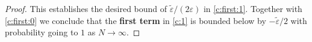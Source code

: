\begin{proof}
This establishes the desired bound of 
$
\tilde{\varepsilon}/(2\varepsilon)
$
in \eqref{c:first:1}.
Together with \eqref{c:first:0}
we conclude that the \textbf{first term} 
in
\eqref{c:1}
is bounded below by
$
-
\tilde{\varepsilon}/2
$
with probability going to $1$ as $N\to\infty$.

\end{proof}
